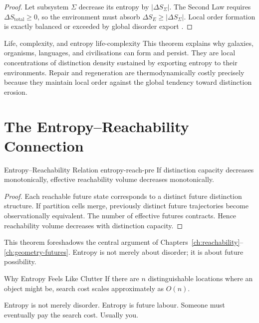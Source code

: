 \documentclass[12pt,twoside,openright]{book}
\begin{document}
\begin{proof}
  Let subsystem $\Sigma$ decrease its entropy by
  $|\Delta S_\Sigma|$. The Second Law requires
  $\Delta S_\mathrm{total} \ge 0$, so the environment
  must absorb $\Delta S_E \ge |\Delta S_\Sigma|$.
  Local order formation is exactly balanced or exceeded
  by global disorder export \parencite{schrodinger1944}.
\end{proof}

\begin{remark}{Life, complexity, and entropy}%
  {life-complexity}
  This theorem explains why galaxies, organisms,
  languages, and civilisations can form and persist.
  They are local concentrations of distinction density
  sustained by exporting entropy to their environments.
  Repair and regeneration are thermodynamically costly
  precisely because they maintain local order against
  the global tendency toward distinction erosion.
\end{remark}

\section{The Entropy--Reachability Connection}
\label{sec:ch3-reach}

\begin{theorem}{Entropy--Reachability Relation}%
  {entropy-reach-pre}
  If distinction capacity decreases monotonically,
  effective reachability volume decreases monotonically.
\end{theorem}

\begin{proof}
  Each reachable future state corresponds to a distinct
  future distinction structure. If partition cells merge,
  previously distinct future trajectories become
  observationally equivalent. The number of effective
  futures contracts. Hence reachability volume decreases
  with distinction capacity.
\end{proof}

This theorem foreshadows the central argument of
Chapters~\ref{ch:reachability}--\ref{ch:geometry-futures}.
Entropy is not merely about disorder; it is about future
possibility.

\begin{envelopeaside}{Why Entropy Feels Like Clutter}
If there are $n$ distinguishable locations where an object
might be, search cost scales approximately as $O(n)$.

Entropy is not merely disorder. Entropy is future labour.
Someone must eventually pay the search cost. Usually you.
\end{envelopeaside}
\end{document}

